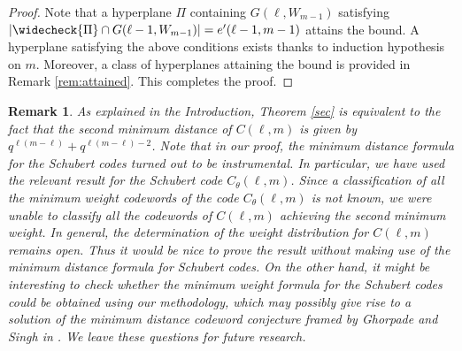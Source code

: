 \documentclass[10pt,a4paper,oneside]{amsproc}
\newtheorem{remark}[theorem]{Remark}
\def\PP{{\mathbb P}}
\begin{document}
\begin{proof}
    Note that a hyperplane $\Pi$ containing $G(\ell, W_{m-1})$ satisfying $|\widecheck{\Pi} \cap G(\ell - 1, W_{m-1})| = e'(\ell - 1, m-1)$ attains the bound. A hyperplane satisfying the above conditions exists thanks to induction hypothesis on $m$. Moreover, a class of hyperplanes attaining the bound is provided in Remark \ref{rem:attained}. This completes the proof. 
    \end{proof}

\begin{remark}\normalfont
As explained in the Introduction, Theorem \ref{sec} is equivalent to the fact that the second minimum distance of $C(\ell, m)$ is given by $q^{\ell (m-\ell)} + q^{\ell (m - \ell) - 2}$. Note that in our proof, the minimum distance formula for the Schubert codes turned out to be instrumental. In particular, we have used the relevant result for the Schubert code $C_\theta (\ell, m)$. Since a classification of all the minimum weight codewords of the code $C_{\theta} (\ell, m)$ is not known, we were unable to classify all the codewords of $C(\ell, m)$ achieving the second minimum weight. In general, the determination of the weight distribution for $C(\ell, m)$ remains open. 
Thus it would be nice to prove the result without making use of the minimum distance formula for Schubert codes. On the other hand, it might be interesting to check whether the minimum weight formula for the Schubert codes could be obtained using our methodology, which may possibly give rise to a solution of the \emph{minimum distance codeword conjecture} framed by Ghorpade and Singh in \cite{GS}. We leave these questions for future research.  
\end{remark}
\end{document}
